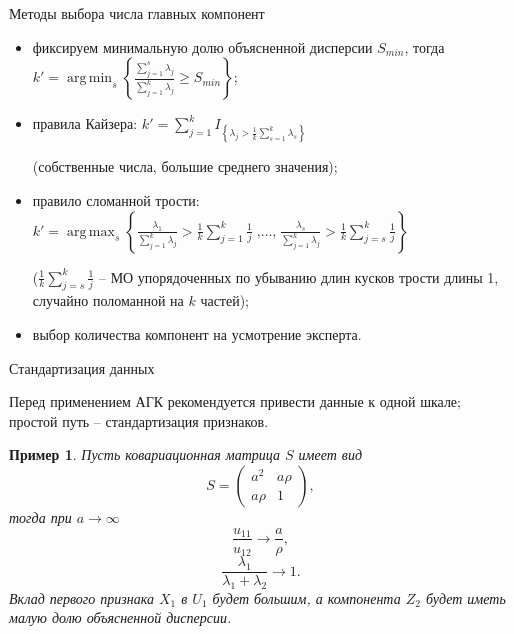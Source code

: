 \documentclass[unicode, notheorems, pdf]{beamer}
\DeclareMathOperator*{\argmin}{arg\,\min}
\DeclareMathOperator*{\argmax}{arg\,\max}
\DeclareMathOperator*{\cdc}{,\dots,}
\newtheorem{example}{Пример}
\begin{document}
\begin{frame}{Методы выбора числа главных компонент}

	\begin{itemize}
		\item фиксируем минимальную долю объясненной дисперсии $S_{min}$, тогда $k' = \displaystyle\argmin_{s}\left\{\frac{\sum_{j=1}^{s}\lambda_j} {\sum_{j=1}^{k}\lambda_j} \ge S_{min}\right\}$;

		\item правила Кайзера: $k' = \displaystyle\sum_{j=1}^{k}I_{\left\{\lambda_j > \frac{1}{k}\sum_{s=1}^{k}\lambda_s\right\}}$

		(собственные числа, большие среднего значения);

		\item правило сломанной трости: \mbox{$k' = \displaystyle\argmax_{s}\left\{ \frac{\lambda_1}{\sum_{j=1}^{k}\lambda_j} > \frac{1}{k}\sum_{j=1}^{k}\frac{1}{j} \cdc \frac{\lambda_s}{\sum_{j=1}^{k}\lambda_j} > \frac{1}{k}\sum_{j=s}^{k}\frac{1}{j} \right\}$}

		($\displaystyle\frac{1}{k}\sum_{j=s}^{k}\frac{1}{j}$ -- МО упорядоченных по убыванию длин кусков трости длины 1, случайно поломанной на $k$ частей);

		\item выбор количества компонент на усмотрение эксперта.
	\end{itemize}
\end{frame}
%
\begin{frame}{Стандартизация данных}

	Перед применением АГК рекомендуется привести данные к одной шкале; простой путь -- стандартизация признаков.

	\vspace{.25cm}
	\begin{example}
		Пусть ковариационная матрица $S$ имеет вид
		\[S = \left(\begin{array}{cc} a^2 & a\rho \\ a\rho & 1 \end{array}\right),\]
		тогда при $a\to\infty$
		\[\frac{u_{11}}{u_{12}} \to \frac{a}{\rho},\]
		\[\frac{\lambda_1}{\lambda_1+\lambda_2} \to 1.\]
		Вклад первого признака $X_1$ в $U_1$ будет большим, а компонента $Z_2$ будет иметь малую долю объясненной дисперсии.
	\end{example}
\end{frame}
\end{document}
